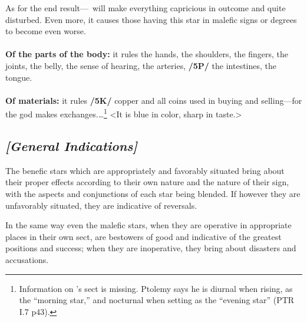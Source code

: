 \mndl[0.2cm]
As for the end result—\Mercury\, will make everything capricious in outcome and quite disturbed. Even more, it causes those having this star in malefic signs or degrees to become even worse. \\
\\
\textbf{Of the parts of the body:} it rules the hands, the shoulders, the fingers, the joints, the belly, the sense of hearing, the arteries, \textbf{/5P/} the intestines, the tongue. \\
\\
\textbf{Of materials:} it rules \textbf{/5K/} copper and all coins used in buying and selling—for the god makes exchanges.\ldots\footnote{Information on \Mercury's sect is missing. Ptolemy says he is diurnal when rising, as the ``morning star,'' and nocturnal when setting as the ``evening star'' (PTR I.7 p43).} <It is blue in color, sharp in taste.>

\secbr
\subsection{\textit{[General Indications]}}
\mndl[0.2cm]
The   benefic stars  which are appropriately and favorably situated bring about their proper effects according to their own nature and the nature of their sign, with the aspects and conjunctions of each star being blended. If however they are unfavorably situated, they are indicative of reversals. 

\mnmb[0.2cm] 
In the same way even the  malefic stars, when they are operative in appropriate places in their own sect, are bestowers of good and indicative of the greatest positions and success; when they are inoperative, they bring about disasters and accusations.

